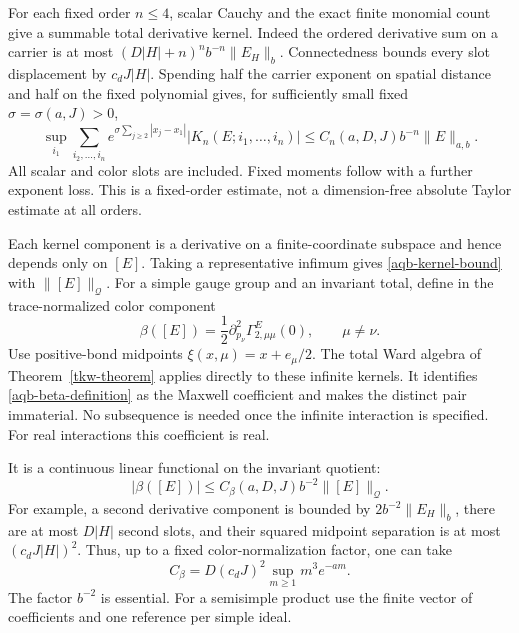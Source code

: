 For each fixed order $n\le4$, scalar Cauchy and the exact finite
monomial count give a summable total derivative kernel. Indeed
the ordered derivative sum on a carrier is at most
$(D|H|+n)^n b^{-n}\|E_H\|_b$. Connectedness bounds every
slot displacement by $c_dJ|H|$. Spending half the carrier
exponent on spatial distance and half on the fixed polynomial
gives, for sufficiently small fixed $\sigma=\sigma(a,J)>0$,
\begin{equation}
 \sup_{i_1}\sum_{i_2,\ldots,i_n}
 e^{\sigma\sum_{j\ge2}|x_j-x_1|}
 |K_n(E;i_1,\ldots,i_n)|
       \le C_n(a,D,J)b^{-n}\|E\|_{a,b}.
 \label{aqb-kernel-bound}
\end{equation}
All scalar and color slots are included. Fixed moments follow
with a further exponent loss. This is a fixed-order estimate,
not a dimension-free absolute Taylor estimate at all orders.

Each kernel component is a derivative on a finite-coordinate
subspace and hence depends only on $[E]$. Taking a representative
infimum gives \eqref{aqb-kernel-bound} with $\|[E]\|_{\mathcal Q}$.
For a simple gauge group and an invariant total, define in the
trace-normalized color component
\begin{equation}
 \beta([E])=\frac12\partial_{p_\nu}^2
                       \Gamma^E_{2,\mu\mu}(0),
 \qquad \mu\ne\nu.
 \label{aqb-beta-definition}
\end{equation}
Use positive-bond midpoints $\xi(x,\mu)=x+e_\mu/2$.
The total Ward algebra of Theorem~\ref{tkw-theorem} applies
directly to these infinite kernels. It identifies
\eqref{aqb-beta-definition} as the Maxwell coefficient and makes
the distinct pair immaterial. No subsequence is needed once
the infinite interaction is specified. For real interactions
this coefficient is real.

It is a continuous linear functional on the invariant quotient:
\begin{equation}
 |\beta([E])|\le C_\beta(a,D,J)b^{-2}
                                      \|[E]\|_{\mathcal Q}.
 \label{aqb-beta-bound}
\end{equation}
For example, a second derivative component is bounded by
$2b^{-2}\|E_H\|_b$, there are at most $D|H|$ second slots,
and their squared midpoint separation is at most
$(c_dJ|H|)^2$. Thus, up to a fixed color-normalization factor,
one can take
\begin{equation}
 C_\beta=D(c_dJ)^2\sup_{m\ge1}m^3e^{-am}.
 \label{aqb-beta-constant}
\end{equation}
The factor $b^{-2}$ is essential. For a semisimple product use
the finite vector of coefficients and one reference per simple
ideal.

